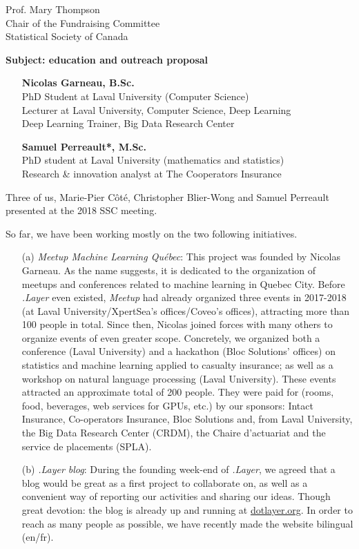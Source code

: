 \documentclass[11pt, a4paper]{letter} %
\begin{document}
\begin{letter}{
	Prof. Mary Thompson\\
	Chair of the Fundraising Committee\\
	Statistical Society of Canada
	
	\bigskip
	\textbf{Subject: education and outreach proposal}%
}
\begin{enumerate}
	\quad Teaching chair on big data analysis for actuariat science --- Intact\\
	\quad Member of the \emph{New Investigators Committee} of the \emph{SSC}
	\item[] \textbf{Nicolas Garneau, B.Sc.}\\
	\quad PhD Student at Laval University (Computer Science)\\
	Lecturer at Laval University, Computer Science, Deep Learning\\
	Deep Learning Trainer, Big Data Research Center
	\item[] \textbf{Samuel Perreault*, M.Sc.}\\
	\quad PhD student at Laval University (mathematics and statistics)\\
	\quad Research \& innovation analyst at The Cooperators Insurance
\end{enumerate}

\noindent Three of us, Marie-Pier Côté, Christopher Blier-Wong and Samuel Perreault presented at the 2018 SSC meeting.

So far, we have been working mostly on the two following initiatives.
\begin{enumerate}
	\item[(a)] \emph{Meetup Machine Learning Québec}: This project was founded by Nicolas Garneau. As the name suggests, it is dedicated to the organization of meetups and conferences related to machine learning in Quebec City. Before \emph{.Layer} even existed, \emph{Meetup} had already organized three events in 2017-2018 (at Laval University/XpertSea's offices/Coveo's offices), attracting more than 100 people in total. Since then, Nicolas joined forces with many others to organize events of even greater scope. Concretely, we organized both a conference (Laval University) and a hackathon (Bloc Solutions' offices) on statistics and machine learning applied to casualty insurance; as well as a workshop on natural language processing (Laval University). These events attracted an approximate total of 200 people. They were paid for (rooms, food, beverages, web services for GPUs, etc.) by our sponsors: Intact Insurance, Co-operators Insurance, Bloc Solutions and, from Laval University, the Big Data Research Center (CRDM), the Chaire d'actuariat and the service de placements (SPLA).
	\item[(b)] \emph{.Layer blog}: During the founding week-end of \emph{.Layer}, we agreed that a blog would be great as a first project to collaborate on, as well as a convenient way of reporting our activities and sharing our ideas. Though great devotion: the blog is already up and running at \href{https://www.dotlayer.org/}{dotlayer.org}. In order to reach as many people as possible, we have recently made the website bilingual (en/fr).
\end{enumerate}


\end{letter}
\end{document}
